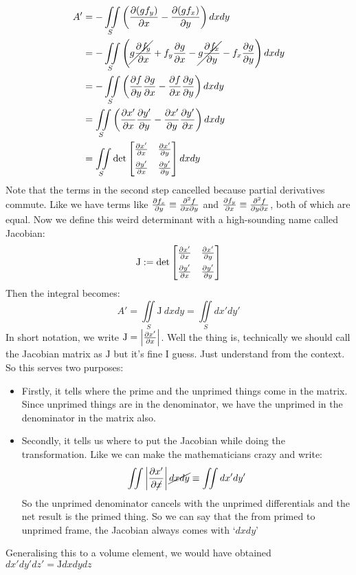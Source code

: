 \begin{align*}
    A' &=-\iint\limits_S \left( \pdv{(gf_y)}{x}-\pdv{(gf_x)}{y} \right)dxdy\\
    &=-\iint\limits_S \left( \cancel{g\pdv{f_y}{x}}+f_y\pdv{g}{x}-\cancel{g\pdv{f_x}{y}}-f_x\pdv{g}{y} \right)dxdy\\
    &=-\iint\limits_S \left( \pdv{f}{y}\pdv{g}{x} - \pdv{f}{x}\pdv{g}{y} \right)dxdy\\
    &=\iint\limits_S \left(   \pdv{x'}{x}\pdv{y'}{y}-\pdv{x'}{y}\pdv{y'}{x} \right)dxdy\\
    &=\iint\limits_S \det \begin{bmatrix}
        \pdv{x'}{x} & \pdv{x'}{y} \\[0.2cm]
        \pdv{y'}{x} & \pdv{y'}{y}
    \end{bmatrix} dxdy
\end{align*}
Note that the terms in the second step cancelled because partial derivatives commute. Like we have terms like $\pdv{f_x}{y}\equiv \frac{\partial^2 f}{\partial x\partial y}$ and $\pdv{f_y}{x}\equiv \frac{\partial^2 f}{\partial y\partial x}$, both of which are equal. Now we define this weird determinant with a high-sounding name called Jacobian:
$$\mathrm{J} := \det \begin{bmatrix}
        \pdv{x'}{x} & \pdv{x'}{y} \\[0.2cm]
        \pdv{y'}{x} & \pdv{y'}{y}
    \end{bmatrix}$$
    Then the integral becomes:
    $$A' = \iint\limits_S  \mathrm{J}\ dxdy = \iint\limits_S dx'dy'$$
    In short notation, we write $\mathrm{J} = \left|\pdv{x'}{x}\right|$. Well the thing is, technically we should call the Jacobian matrix as $\mathrm{J}$ but it's fine I guess. Just understand from the context. So this serves two purposes: \begin{itemize}
        \item Firstly, it tells where the prime and the unprimed things come in the matrix. Since unprimed things are in the denominator, we have the unprimed in the denominator in the matrix also. 
        \item Secondly, it tells us where to put the Jacobian while doing the transformation. Like we can make the mathematicians crazy and write:
        $$\iint \left|\pdv{x'}{\cancel{x}}\right| \cancel{dxdy} \equiv \iint dx'dy'$$
        So the unprimed denominator cancels with the unprimed differentials and the net result is the primed thing. So we can say that the from primed to unprimed frame, the Jacobian always comes with `$dxdy$'
    \end{itemize}
    Generalising this to a volume element, we would have obtained $dx' dy' dz' = \mathrm{J}dx dy dz$
